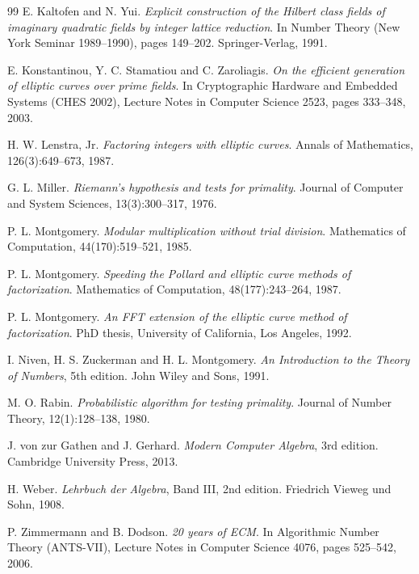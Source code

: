 \documentclass[11pt,a4paper]{article}
\begin{document}
\begin{thebibliography}{99}
 E. Kaltofen and N. Yui.
  \emph{Explicit construction of the Hilbert class fields of imaginary
  quadratic fields by integer lattice reduction}.
  In Number Theory (New York Seminar 1989--1990), pages 149--202.
  Springer-Verlag, 1991.

 E. Konstantinou, Y. C. Stamatiou and
  C. Zaroliagis.
  \emph{On the efficient generation of elliptic curves over prime
  fields}.
  In Cryptographic Hardware and Embedded Systems (CHES 2002),
  Lecture Notes in Computer Science 2523, pages 333--348, 2003.

 H. W. Lenstra, Jr.
  \emph{Factoring integers with elliptic curves}.
  Annals of Mathematics, 126(3):649--673, 1987.

 G. L. Miller.
  \emph{Riemann's hypothesis and tests for primality}.
  Journal of Computer and System Sciences, 13(3):300--317, 1976.

 P. L. Montgomery.
  \emph{Modular multiplication without trial division}.
  Mathematics of Computation, 44(170):519--521, 1985.

 P. L. Montgomery.
  \emph{Speeding the Pollard and elliptic curve methods of
  factorization}.
  Mathematics of Computation, 48(177):243--264, 1987.

 P. L. Montgomery.
  \emph{An FFT extension of the elliptic curve method of factorization}.
  PhD thesis, University of California, Los Angeles, 1992.

 I. Niven, H. S. Zuckerman and H. L. Montgomery.
  \emph{An Introduction to the Theory of Numbers}, 5th edition.
  John Wiley and Sons, 1991.

 M. O. Rabin.
  \emph{Probabilistic algorithm for testing primality}.
  Journal of Number Theory, 12(1):128--138, 1980.

 J. von zur Gathen and J. Gerhard.
  \emph{Modern Computer Algebra}, 3rd edition.
  Cambridge University Press, 2013.

 H. Weber.
  \emph{Lehrbuch der Algebra}, Band III, 2nd edition.
  Friedrich Vieweg und Sohn, 1908.

 P. Zimmermann and B. Dodson.
  \emph{20 years of ECM}.
  In Algorithmic Number Theory (ANTS-VII), Lecture Notes in Computer
  Science 4076, pages 525--542, 2006.

\end{thebibliography}
\end{document}
